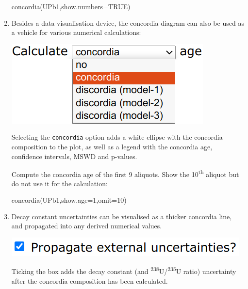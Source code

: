 \begin{refsection}
\begin{enumerate}
\begin{console}
concordia(UPb1,show.numbers=TRUE)
\end{console}

\item Besides a data visualisation device, the concordia diagram can
  also be used as a vehicle for various numerical calculations:

\noindent\begin{minipage}[t]{.3\linewidth}
  \strut\vspace*{-\baselineskip}\newline
  \includegraphics[width=\linewidth]{../figures/ConcordiaShowAge.png}
\end{minipage}
\begin{minipage}[t]{.7\linewidth}
  Selecting the \texttt{concordia} option adds a white ellipse with
  the concordia composition to the plot, as well as a legend with the
  concordia age, confidence intervals, MSWD and p-values.
\end{minipage}

Compute the concordia age of the first 9 aliquots. Show the
10\textsuperscript{th} aliquot but do not use it for the calculation:

\begin{console}
concordia(UPb1,show.age=1,omit=10)
\end{console}

\item Decay constant uncertainties can be visualised as a thicker
  concordia line, and propagated into any derived numerical values.

\noindent\begin{minipage}[t]{.35\linewidth}
\strut\vspace*{-\baselineskip}\newline
\includegraphics[width=\linewidth]{../figures/concordiaexterr.png}
\end{minipage}
\begin{minipage}[t]{.65\linewidth}
  Ticking the box adds the decay constant (and
  \textsuperscript{238}U/\textsuperscript{235}U ratio) uncertainty
  after the concordia composition has been calculated.
\end{minipage}


\end{enumerate}
\end{refsection}
